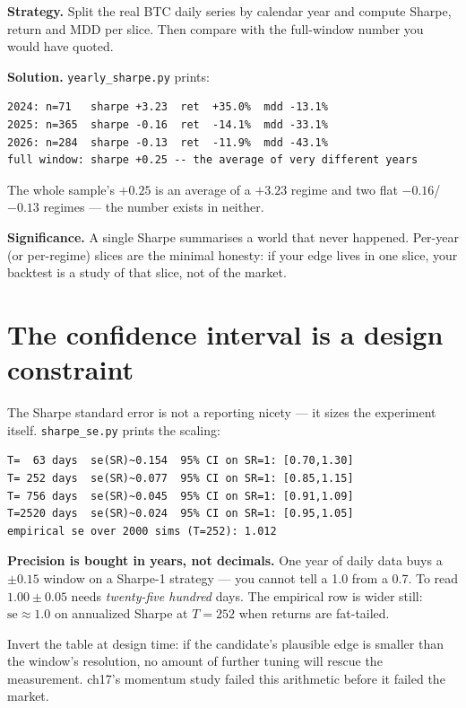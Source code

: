 \begin{example}\label{ex:yrsharpe}
\textbf{Strategy.} Split the real BTC daily series by calendar
year and compute Sharpe, return and MDD per slice. Then compare
with the full-window number you would have quoted.

\textbf{Solution.} \texttt{yearly\_sharpe.py} prints:
\begin{verbatim}
2024: n=71   sharpe +3.23  ret  +35.0%  mdd -13.1%
2025: n=365  sharpe -0.16  ret  -14.1%  mdd -33.1%
2026: n=284  sharpe -0.13  ret  -11.9%  mdd -43.1%
full window: sharpe +0.25 -- the average of very different years
\end{verbatim}
The whole sample's $+0.25$ is an average of a $+3.23$ regime and
two flat $-0.16$/$-0.13$ regimes --- the number exists in neither.

\textbf{Significance.} A single Sharpe summarises a world that
never happened. Per-year (or per-regime) slices are the minimal
honesty: if your edge lives in one slice, your backtest is a
study of that slice, not of the market.
\end{example}


\section{The confidence interval is a design constraint}\label{sec:cidesign}
The Sharpe standard error is not a reporting nicety --- it
sizes the experiment itself. \texttt{sharpe\_se.py} prints the
scaling:
\begin{verbatim}
T=  63 days  se(SR)~0.154  95% CI on SR=1: [0.70,1.30]
T= 252 days  se(SR)~0.077  95% CI on SR=1: [0.85,1.15]
T= 756 days  se(SR)~0.045  95% CI on SR=1: [0.91,1.09]
T=2520 days  se(SR)~0.024  95% CI on SR=1: [0.95,1.05]
empirical se over 2000 sims (T=252): 1.012
\end{verbatim}
\begin{example}\label{ex:cidesign}
\textbf{Precision is bought in years, not decimals.} One year of
daily data buys a $\pm0.15$ window on a Sharpe-1 strategy ---
you cannot tell a 1.0 from a 0.7. To read $1.00\pm0.05$ needs
\emph{twenty-five hundred} days. The empirical row is wider
still: $\mathrm{se}\approx1.0$ on annualized Sharpe at $T{=}252$
when returns are fat-tailed.
\begin{solution}
Invert the table at design time: if the candidate's plausible
edge is smaller than the window's resolution, no amount of
further tuning will rescue the measurement. ch17's momentum
study failed this arithmetic before it failed the market.
\end{solution}
\end{example}
